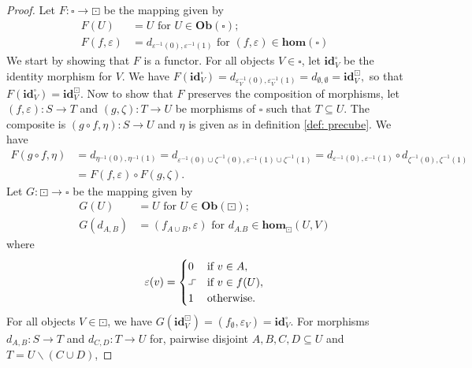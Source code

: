 \documentclass[11pt,a4paper,oldfontcommands]{memoir}
\newcommand*\exec{%
  \raisebox{1pt}{%
    \begin{tikzpicture}[x=.8ex,y=1ex,-]
      \draw (0,0) -- (1,0) -- (1,1) -- (2,1);
    \end{tikzpicture}}}
\begin{document}
\begin{proof}
     Let $F: \square \rightarrow \boxdot$ be the mapping given by 
     \begin{align*}
F(U)& =U \text{ for } U \in \mathbf{Ob}(\square);  \\
F(f,\varepsilon)&=d_{\varepsilon^{-1}(0),\varepsilon^{-1}(1)} \text{ for } (f,\varepsilon) \in \mathbf{hom}(\square)    
\end{align*}   
We start by showing that $F$ is a functor. For all objects $V \in \square$, let $\mathbf{id}^{\square}_{V}$ be the identity morphism for $V$. We have $F(\mathbf{id}^{\square}_{V})=d_{\varepsilon_V^{-1}(0),\varepsilon_V^{-1}(1)}
=d_{\emptyset,\emptyset}
=\mathbf{id}^{\boxdot}_{V},$ so that $F(\mathbf{id}^{\square}_{V})=\mathbf{id}^{\boxdot}_{V}$. Now to show that $F$ preserves the composition of morphisms, let $(f,\varepsilon):S\to T$ and $(g,\zeta):T\to U$ be morphisms of $\square$ such that $T\subseteq U$. The composite is $(g\circ f,\eta): S\rightarrow U$ and $\eta$ is given as in definition \ref{def: precube}. We have
     \begin{align*}
F(g\circ f,\eta)& =d_{\eta^{-1}(0),\eta^{-1}(1)}=d_{\varepsilon^{-1}(0)\cup \zeta^{-1}(0),\varepsilon^{-1}(1)\cup \zeta^{-1}(1)} =d_{\varepsilon^{-1}(0),\varepsilon^{-1}(1)} \circ d_{\zeta^{-1}(0), \zeta^{-1}(1)} \\
&=F(f,\varepsilon) \circ F(g,\zeta).   
\end{align*}   
 Let $G: \boxdot \rightarrow \square$ be the mapping given by 
    \begin{align*}
G(U)& =U \text{ for } U \in \mathbf{Ob}(\boxdot);  \\
G(d_{A,B})&=(f_{A \cup B },\varepsilon) \text{ for } d_{A.B} \in \mathbf{hom}_{\boxdot}(U,V)    
\end{align*}   
where  \begin{equation} \label{eq: epsilon of G}
      \varepsilon(v)=
      \begin{cases}
        0 & \text{if $v\in A$}, \\
        \exec & \text{if $v\in f(U)$}, \\
        1 & \text{otherwise}.
      \end{cases}
    \end{equation}
For all objects $V \in \boxdot$, we have $G(\mathbf{id}^{\boxdot}_{V}) =(f_{\emptyset},\varepsilon_V) =\mathbf{id}^{\square}_{V}$. For morphisms $d_{A, B}: S \rightarrow T$ and $d_{C, D}: T \rightarrow U$ for, pairwise disjoint $A, B, C, D \subseteq U$ and $T=U \backslash(C \cup D)$, 

\end{proof}
\end{document}
